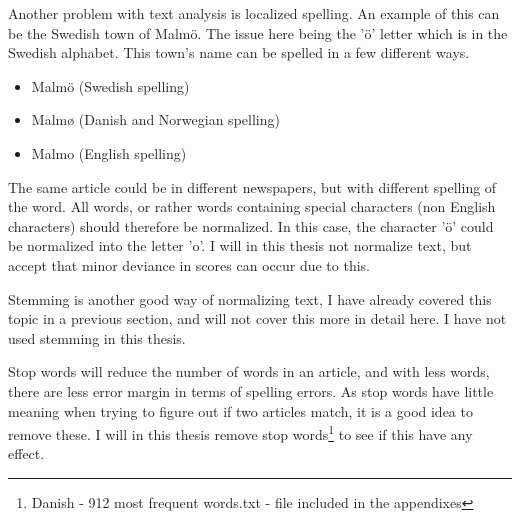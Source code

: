 Another problem with text analysis is localized spelling. An example of this can be the Swedish town of Malmö. The issue here being the 'ö' letter which is in the Swedish alphabet. This town's name can be spelled in a few different ways.

\pagebreak

\begin{itemize}
\item Malmö (Swedish spelling)
\item Malmø (Danish and Norwegian spelling)
\item Malmo (English spelling)
\end{itemize}

The same article could be in different newspapers, but with different spelling of the word. All words, or rather words containing special characters (non English characters) should therefore be normalized. In this case, the character 'ö' could be normalized into the letter 'o'. I will in this thesis not normalize text, but accept that minor deviance in scores can occur due to this.

Stemming is another good way of normalizing text, I have already covered this topic in a previous section, and will not cover this more in detail here. I have not used stemming in this thesis.

Stop words will reduce the number of words in an article, and with less words, there are less error margin in terms of spelling errors. As stop words have little meaning when trying to figure out if two articles match, it is a good idea to remove these. I will in this thesis remove stop words\footnote{Danish - 912 most frequent words.txt - file included in the appendixes} to see if this have any effect. 









